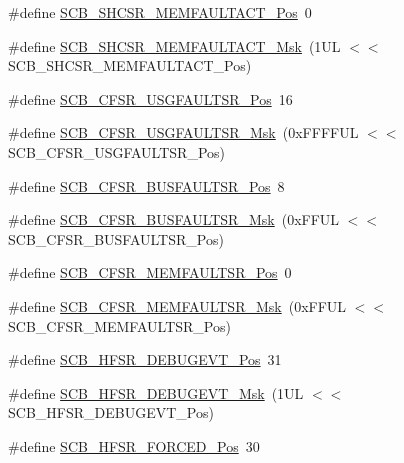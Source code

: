 \begin{DoxyCompactItemize}
\item 
\#define \hyperlink{group___c_m_s_i_s___s_c_b_ga7c856f79a75dcc1d1517b19a67691803}{S\-C\-B\-\_\-\-S\-H\-C\-S\-R\-\_\-\-M\-E\-M\-F\-A\-U\-L\-T\-A\-C\-T\-\_\-\-Pos}~0
\item 
\#define \hyperlink{group___c_m_s_i_s___s_c_b_ga9147fd4e1b12394ae26eadf900a023a3}{S\-C\-B\-\_\-\-S\-H\-C\-S\-R\-\_\-\-M\-E\-M\-F\-A\-U\-L\-T\-A\-C\-T\-\_\-\-Msk}~(1\-U\-L $<$$<$ S\-C\-B\-\_\-\-S\-H\-C\-S\-R\-\_\-\-M\-E\-M\-F\-A\-U\-L\-T\-A\-C\-T\-\_\-\-Pos)
\item 
\#define \hyperlink{group___c_m_s_i_s___s_c_b_gac8e4197b295c8560e68e2d71285c7879}{S\-C\-B\-\_\-\-C\-F\-S\-R\-\_\-\-U\-S\-G\-F\-A\-U\-L\-T\-S\-R\-\_\-\-Pos}~16
\item 
\#define \hyperlink{group___c_m_s_i_s___s_c_b_ga565807b1a3f31891f1f967d0fa30d03f}{S\-C\-B\-\_\-\-C\-F\-S\-R\-\_\-\-U\-S\-G\-F\-A\-U\-L\-T\-S\-R\-\_\-\-Msk}~(0x\-F\-F\-F\-F\-U\-L $<$$<$ S\-C\-B\-\_\-\-C\-F\-S\-R\-\_\-\-U\-S\-G\-F\-A\-U\-L\-T\-S\-R\-\_\-\-Pos)
\item 
\#define \hyperlink{group___c_m_s_i_s___s_c_b_ga555a24f4f57d199f91d1d1ab7c8c3c8a}{S\-C\-B\-\_\-\-C\-F\-S\-R\-\_\-\-B\-U\-S\-F\-A\-U\-L\-T\-S\-R\-\_\-\-Pos}~8
\item 
\#define \hyperlink{group___c_m_s_i_s___s_c_b_ga26dc1ddfdc37a6b92597a6f7e498c1d6}{S\-C\-B\-\_\-\-C\-F\-S\-R\-\_\-\-B\-U\-S\-F\-A\-U\-L\-T\-S\-R\-\_\-\-Msk}~(0x\-F\-F\-U\-L $<$$<$ S\-C\-B\-\_\-\-C\-F\-S\-R\-\_\-\-B\-U\-S\-F\-A\-U\-L\-T\-S\-R\-\_\-\-Pos)
\item 
\#define \hyperlink{group___c_m_s_i_s___s_c_b_ga91f41491cec5b5acca3fbc94efbd799e}{S\-C\-B\-\_\-\-C\-F\-S\-R\-\_\-\-M\-E\-M\-F\-A\-U\-L\-T\-S\-R\-\_\-\-Pos}~0
\item 
\#define \hyperlink{group___c_m_s_i_s___s_c_b_gad46716159a3808c9e7da22067d6bec98}{S\-C\-B\-\_\-\-C\-F\-S\-R\-\_\-\-M\-E\-M\-F\-A\-U\-L\-T\-S\-R\-\_\-\-Msk}~(0x\-F\-F\-U\-L $<$$<$ S\-C\-B\-\_\-\-C\-F\-S\-R\-\_\-\-M\-E\-M\-F\-A\-U\-L\-T\-S\-R\-\_\-\-Pos)
\item 
\#define \hyperlink{group___c_m_s_i_s___s_c_b_ga300c90cfb7b35c82b4d44ad16c757ffb}{S\-C\-B\-\_\-\-H\-F\-S\-R\-\_\-\-D\-E\-B\-U\-G\-E\-V\-T\-\_\-\-Pos}~31
\item 
\#define \hyperlink{group___c_m_s_i_s___s_c_b_gababd60e94756bb33929d5e6f25d8dba3}{S\-C\-B\-\_\-\-H\-F\-S\-R\-\_\-\-D\-E\-B\-U\-G\-E\-V\-T\-\_\-\-Msk}~(1\-U\-L $<$$<$ S\-C\-B\-\_\-\-H\-F\-S\-R\-\_\-\-D\-E\-B\-U\-G\-E\-V\-T\-\_\-\-Pos)
\item 
\#define \hyperlink{group___c_m_s_i_s___s_c_b_gab361e54183a378474cb419ae2a55d6f4}{S\-C\-B\-\_\-\-H\-F\-S\-R\-\_\-\-F\-O\-R\-C\-E\-D\-\_\-\-Pos}~30
$$
\end{DoxyCompactItemize}
